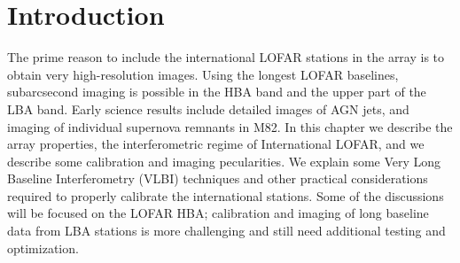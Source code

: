 \documentclass[graybox]{svmult}
\begin{document}

\section{Introduction}
\label{sec:introduction}

The prime reason to include the international LOFAR stations in the array is to
obtain very high-resolution images.  Using the longest LOFAR baselines,
subarcsecond imaging is possible in the HBA band and the upper part of the LBA
band. Early science results include detailed images of AGN jets, and imaging of
individual supernova remnants in M82. In this chapter we describe the array
properties, the interferometric regime of International LOFAR, and we describe
some calibration and imaging pecularities. We explain some Very Long Baseline
Interferometry (VLBI) techniques and other practical considerations required to
properly calibrate the international stations. Some of the discussions will be
focused on the LOFAR HBA; calibration and imaging of long baseline data from
LBA stations is more challenging and still need additional testing and
optimization.
\end{document}
